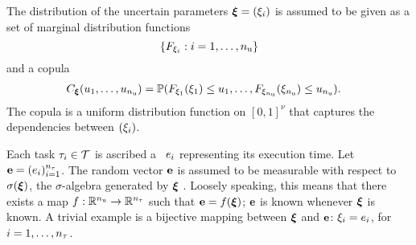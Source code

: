 The distribution of the uncertain parameters $\bm{\xi} = (\xi_i)$ is assumed to be
given as a set of marginal distribution functions
\[
  \{ F_{\xi_i}: i = 1, \dots, {n_\text{u}} \}
\]
and a copula \cite{nelsen2006}
\begin{align*}
  C_{\bm{\xi}}(u_1, \dots, u_{n_\text{u}}) &= \mathbb{P}(F_{\xi_1}(\xi_1) \leq u_1, \dots, F_{\xi_{n_\text{u}}}(\xi_{n_\text{u}}) \leq u_{n_\text{u}}).
\end{align*}
The copula is a uniform distribution function on $[0, 1]^\nu$ that captures the
dependencies between $(\xi_i)$.

Each task $\tau_i \in \mathcal{T}$ is ascribed a \rv\ $e_i$ representing its
execution time. Let $\mathbf{e} = (e_i)_{i=1}^{{n_\tau}}$. The random vector $\mathbf{e}$ is
assumed to be measurable with respect to $\sigma(\bm{\xi})$, the $\sigma$-algebra
generated by $\bm{\xi}$ \cite{durrett2010}. Loosely speaking, this means that there
exists a map $f: \mathbb{R}^{n_\text{u}} \to \mathbb{R}^{n_\tau}$ such that $\mathbf{e} = f(\bm{\xi})$; $\mathbf{e}$ is
known whenever $\bm{\xi}$ is known. A trivial example is a bijective mapping between
$\bm{\xi}$ and $\mathbf{e}$: $\xi_i = e_i$, for $i = 1, \dots, {n_\tau}$.
